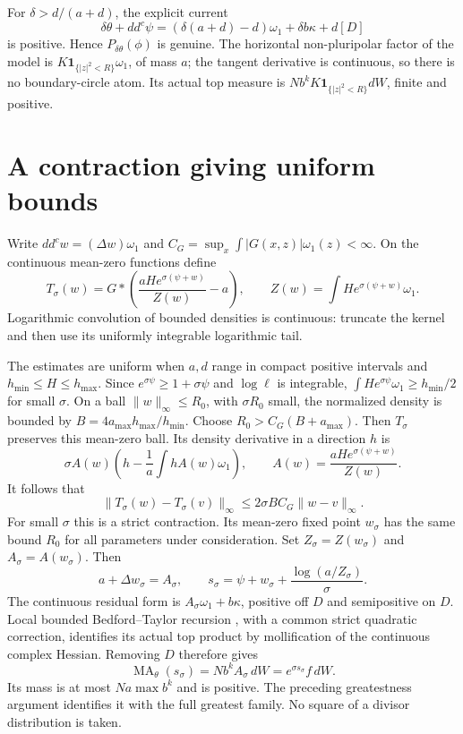 \documentclass[11pt]{article}
\newcommand{\ddc}{dd^c}
\newcommand{\MA}{\operatorname{MA}}
\theoremstyle{remark}\newtheorem{remark}[theorem]{Remark}
\begin{document}
For $\delta>d/(a+d)$, the explicit current
\[
 \delta\theta+\ddc\psi
 =(\delta(a+d)-d)\omega_1+\delta b\kappa+d[D]
\]
is positive. Hence $P_{\delta\theta}(\phi)$ is genuine.
The horizontal non-pluripolar factor of the model is
$K\mathbf1_{\{|z|^2<R\}}\omega_1$, of mass $a$; the tangent derivative
is continuous, so there is no boundary-circle atom. Its actual top measure
is $N b^kK\mathbf1_{\{|z|^2<R\}}dW$, finite and positive.

\section{A contraction giving uniform bounds}

Write $\ddc w=(\Delta w)\omega_1$ and
$C_G=\sup_x\int|G(x,z)|\omega_1(z)<\infty$.
On the continuous mean-zero functions define
\[
 T_\sigma(w)=G*\left(\frac{aH e^{\sigma(\psi+w)}}{Z(w)}-a\right),
 \qquad Z(w)=\int H e^{\sigma(\psi+w)}\omega_1.
\]
Logarithmic convolution of bounded densities is continuous: truncate the
kernel and then use its uniformly integrable logarithmic tail.

The estimates are uniform when $a,d$ range in compact positive intervals
and $h_{\min}\leq H\leq h_{\max}$. Since
$e^{\sigma\psi}\geq1+\sigma\psi$ and $\log\ell$ is integrable,
$\int H e^{\sigma\psi}\omega_1\geq h_{\min}/2$ for small $\sigma$.
On a ball $\|w\|_\infty\leq R_0$, with $\sigma R_0$ small, the normalized
density is bounded by $B=4a_{\max}h_{\max}/h_{\min}$.
Choose $R_0>C_G(B+a_{\max})$.
Then $T_\sigma$ preserves this mean-zero ball. Its density derivative in a
direction $h$ is
\[
 \sigma A(w)\left(h-\frac1a\int h A(w)\omega_1\right),
 \qquad A(w)=\frac{aH e^{\sigma(\psi+w)}}{Z(w)}.
\]
It follows that
\[
 \|T_\sigma(w)-T_\sigma(v)\|_\infty
 \leq2\sigma B C_G\|w-v\|_\infty.
\]
For small $\sigma$ this is a strict contraction. Its mean-zero fixed point
$w_\sigma$ has the same bound $R_0$ for all parameters under consideration.
Set $Z_\sigma=Z(w_\sigma)$ and $A_\sigma=A(w_\sigma)$.
Then
\[
 a+\Delta w_\sigma=A_\sigma,\qquad
 s_\sigma=\psi+w_\sigma+\frac{\log(a/Z_\sigma)}\sigma.
\]
The continuous residual form is
$A_\sigma\omega_1+b\kappa$, positive off $D$ and semipositive on $D$.
Local bounded Bedford--Taylor recursion \cite{BT}, with a common strict
quadratic correction, identifies its actual top product by mollification of the
continuous complex Hessian. Removing $D$ therefore gives
\[
 \MA_\theta(s_\sigma)=N b^k A_\sigma\,dW
                       =e^{\sigma s_\sigma}f\,dW.
\]
Its mass is at most $N a\max b^k$ and is positive.
The preceding greatestness argument identifies it with the full greatest
family. No square of a divisor distribution is taken.
\end{document}
